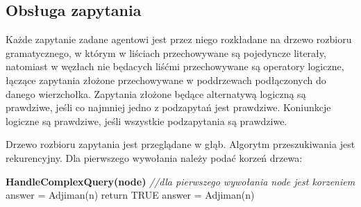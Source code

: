 \documentclass[a4paper,12pt]{mwart}
\begin{document}
\subsection{Obsługa zapytania}
Każde zapytanie zadane agentowi jest przez niego rozkładane na drzewo rozbioru gramatycznego, w którym w liściach przechowywane są pojedyncze literały, natomiast w węzłach nie będacych liśćmi przechowywane są operatory logiczne, łączące zapytania złożone przechowywane w poddrzewach podłączonych do danego wierzchołka.
Zapytania złożone będące alternatywą logiczną są prawdziwe, jeśli co najmniej jedno z podzapytań jest prawdziwe. Koniunkcje logiczne są prawdziwe, jeśli wszystkie podzapytania są prawdziwe.

Drzewo rozbioru zapytania jest przeglądane w głąb. Algorytm przeszukiwania jest rekurencyjny. Dla pierwszego wywołania należy podać korzeń drzewa:
\begin{algorithm}
\begin{algorithmic}
\STATE \textbf{HandleComplexQuery(node)}
\STATE \textit{//dla pierwszego wywołania node jest korzeniem}
\ENDIF    
{}
             	\STATE answer = Adjiman(n)
                \STATE return TRUE
		\ENDIF
	    \ENDFOR
\ENDIF
{}
\STATE answer = Adjiman(n)
\ENDIF
\ENDFOR
{}
\ENDIF
\ENDIF
\end{algorithmic}
\end{algorithm}
\end{document}
